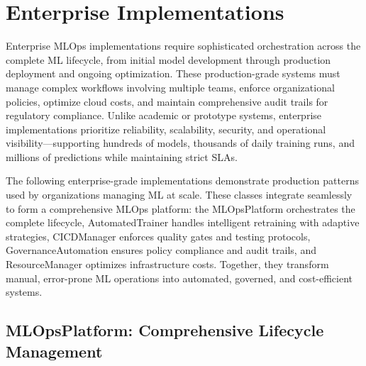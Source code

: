 \section{Enterprise Implementations}

Enterprise MLOps implementations require sophisticated orchestration across the complete ML lifecycle, from initial model development through production deployment and ongoing optimization. These production-grade systems must manage complex workflows involving multiple teams, enforce organizational policies, optimize cloud costs, and maintain comprehensive audit trails for regulatory compliance. Unlike academic or prototype systems, enterprise implementations prioritize reliability, scalability, security, and operational visibility---supporting hundreds of models, thousands of daily training runs, and millions of predictions while maintaining strict SLAs.

The following enterprise-grade implementations demonstrate production patterns used by organizations managing ML at scale. These classes integrate seamlessly to form a comprehensive MLOps platform: the MLOpsPlatform orchestrates the complete lifecycle, AutomatedTrainer handles intelligent retraining with adaptive strategies, CICDManager enforces quality gates and testing protocols, GovernanceAutomation ensures policy compliance and audit trails, and ResourceManager optimizes infrastructure costs. Together, they transform manual, error-prone ML operations into automated, governed, and cost-efficient systems.

\subsection{MLOpsPlatform: Comprehensive Lifecycle Management}

